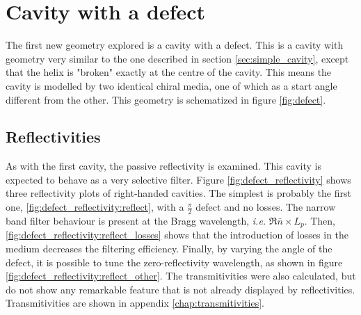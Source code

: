 \section{Cavity with a defect}
\label{sec:defect_cavity}
The first new geometry explored is a cavity with a defect. This is a cavity with geometry very similar to the one described in section \ref{sec:simple_cavity}, except that the helix is "broken" exactly at the centre of the cavity. This means the cavity is modelled by two identical chiral media, one of which as a start angle different from the other. This geometry is schematized in figure \ref{fig:defect}.

\subsection{Reflectivities}

As with the first cavity, the passive reflectivity is examined. This cavity is expected to behave as a very selective filter. Figure \ref{fig:defect_reflectivity} shows three reflectivity plots of right-handed cavities. The simplest is probably the first one, \ref{fig:defect_reflectivity:reflect}, with a $\frac{\pi}{2}$ defect and no losses. The narrow band filter behaviour is present at the Bragg wavelength, \textit{i.e.} $\Re{\bar{n}}\times L_p$\cite{mccall_simplified_2009}. Then, \ref{fig:defect_reflectivity:reflect_losses} shows that the introduction of losses in the medium decreases the filtering efficiency. Finally, by varying the angle of the defect, it is possible to tune the zero-reflectivity wavelength, as shown in figure \ref{fig:defect_reflectivity:reflect_other}. The transmitivities were also calculated, but do not show any remarkable feature that is not already displayed by reflectivities. Transmitivities are shown in appendix \ref{chap:transmitivities}.


